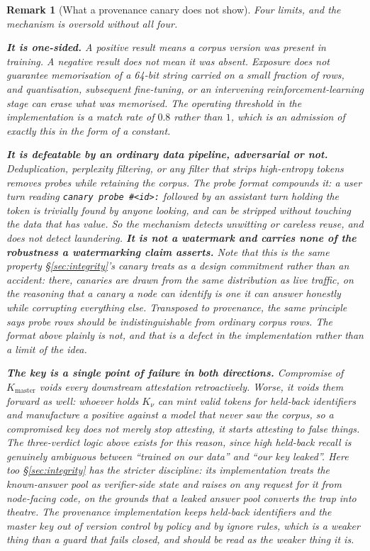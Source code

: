 \documentclass[11pt]{article}
\newtheorem{remark}{Remark}
\begin{document}
\begin{remark}[What a provenance canary does not show]
\label{rem:provlimits}
Four limits, and the mechanism is oversold without all four.

\textbf{It is one-sided.} A positive result means a corpus version was present in training. A negative result does not mean it was absent. Exposure does not guarantee memorisation of a 64-bit string carried on a small fraction of rows, and quantisation, subsequent fine-tuning, or an intervening reinforcement-learning stage can erase what was memorised. The operating threshold in the implementation is a match rate of $0.8$ rather than $1$, which is an admission of exactly this in the form of a constant.

\textbf{It is defeatable by an ordinary data pipeline, adversarial or not.} Deduplication, perplexity filtering, or any filter that strips high-entropy tokens removes probes while retaining the corpus. The probe format compounds it: a user turn reading \texttt{canary probe \#<id>:} followed by an assistant turn holding the token is trivially found by anyone looking, and can be stripped without touching the data that has value. So the mechanism detects unwitting or careless reuse, and does not detect laundering. \textbf{It is not a watermark and carries none of the robustness a watermarking claim asserts.} Note that this is the same property \S\ref{sec:integrity}'s canary treats as a design commitment rather than an accident: there, canaries are drawn from the same distribution as live traffic, on the reasoning that a canary a node can identify is one it can answer honestly while corrupting everything else. Transposed to provenance, the same principle says probe rows should be indistinguishable from ordinary corpus rows. The format above plainly is not, and that is a defect in the implementation rather than a limit of the idea.

\textbf{The key is a single point of failure in both directions.} Compromise of $K_{\mathrm{master}}$ voids every downstream attestation retroactively. Worse, it voids them forward as well: whoever holds $K_\nu$ can mint valid tokens for held-back identifiers and manufacture a positive against a model that never saw the corpus, so a compromised key does not merely stop attesting, it starts attesting to false things. The three-verdict logic above exists for this reason, since high held-back recall is genuinely ambiguous between ``trained on our data'' and ``our key leaked''. Here too \S\ref{sec:integrity} has the stricter discipline: its implementation treats the known-answer pool as verifier-side state and raises on any request for it from node-facing code, on the grounds that a leaked answer pool converts the trap into theatre. The provenance implementation keeps held-back identifiers and the master key out of version control by policy and by ignore rules, which is a weaker thing than a guard that fails closed, and should be read as the weaker thing it is.


\end{remark}
\end{document}
